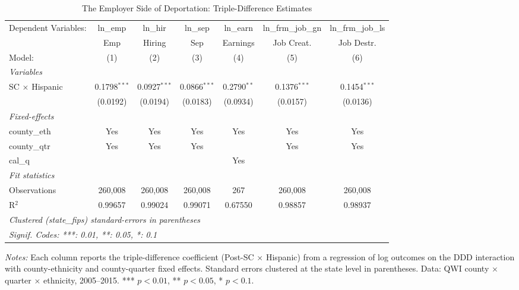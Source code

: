 
\begin{table}[htbp]
   \caption{\label{tab:main_ddd} The Employer Side of Deportation: Triple-Difference Estimates}
   \centering
   \centering
   \begin{adjustbox}{max width=\textwidth}
   \begin{tabular}{lcccccc}
      \tabularnewline \midrule \midrule
      Dependent Variables:  & ln\_emp        & ln\_hir        & ln\_sep        & ln\_earn      & ln\_frm\_job\_gn    & ln\_frm\_job\_ls\\     
                            & Emp            & Hiring         & Sep            & Earnings      & Job Creat.          & Job Destr. \\   
      Model:                & (1)            & (2)            & (3)            & (4)           & (5)                 & (6)\\  
      \midrule
      \emph{Variables}\\
      SC $\times$ Hispanic  & 0.1798$^{***}$ & 0.0927$^{***}$ & 0.0866$^{***}$ & 0.2790$^{**}$ & 0.1376$^{***}$      & 0.1454$^{***}$\\   
                            & (0.0192)       & (0.0194)       & (0.0183)       & (0.0934)      & (0.0157)            & (0.0136)\\   
      \midrule
      \emph{Fixed-effects}\\
      county\_eth           & Yes            & Yes            & Yes            & Yes           & Yes                 & Yes\\  
      county\_qtr           & Yes            & Yes            & Yes            &               & Yes                 & Yes\\  
      cal\_q                &                &                &                & Yes           &                     & \\  
      \midrule
      \emph{Fit statistics}\\
      Observations          & 260,008        & 260,008        & 260,008        & 267           & 260,008             & 260,008\\  
      R$^2$                 & 0.99657        & 0.99024        & 0.99071        & 0.67550       & 0.98857             & 0.98937\\  
      \midrule \midrule
      \multicolumn{7}{l}{\emph{Clustered (state\_fips) standard-errors in parentheses}}\\
      \multicolumn{7}{l}{\emph{Signif. Codes: ***: 0.01, **: 0.05, *: 0.1}}\\
   \end{tabular}
   \end{adjustbox}

   \par \raggedright 
   \textit{Notes:} Each column reports the triple-difference coefficient (Post-SC $\times$ Hispanic) from a regression of log outcomes on the DDD interaction with county-ethnicity and county-quarter fixed effects. Standard errors clustered at the state level in parentheses. Data: QWI county $\times$ quarter $\times$ ethnicity, 2005--2015. *** $p<0.01$, ** $p<0.05$, * $p<0.1$.
\end{table}


